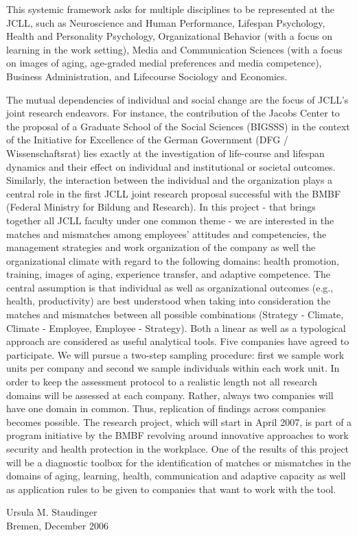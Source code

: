 This systemic framework asks for multiple disciplines to be represented at the JCLL, such as Neuroscience and Human Performance, Lifespan Psychology, Health and Personality Psychology, Organizational Behavior (with a focus on learning in the work setting), Media and Communication Sciences (with a focus on images of aging, age-graded medial preferences and media competence), Business Administration, and Lifecourse Sociology and Economics.


The mutual  dependencies of individual and social change are the focus of JCLL's joint research endeavors. For instance, the contribution of the Jacobs Center to the proposal of a Graduate School of the Social Sciences (BIGSSS) in the context of the Initiative for Excellence of the German Government (DFG / Wissenschaftsrat) lies exactly at the investigation of life-course and lifespan dynamics and their effect on individual and institutional or societal outcomes. Similarly, the interaction between the individual and the organization plays a central role in the first JCLL joint research proposal successful with the BMBF (Federal Ministry for Bildung and Research). In this project - that brings together all JCLL faculty under one common theme - we are interested in the matches and mismatches among employees' attitudes and competencies, the management strategies and work organization of the company as well the organizational climate with regard to the following domains: health promotion, training, images of aging, experience transfer, and adaptive competence. The central assumption is that individual as well as organizational outcomes (e.g., health, productivity) are best understood when taking into consideration the matches and mismatches between all possible combinations (Strategy - Climate, Climate - Employee, Employee - Strategy). Both a linear as well as a typological approach are considered as useful analytical tools. Five companies have agreed to participate. We will pursue a two-step sampling procedure: first we sample work units per company and second we sample individuals within each work unit. In order to keep the assessment protocol to a realistic length not all research domains will be assessed at each company. Rather, always two companies will have one domain in common. Thus, replication of findings across companies becomes possible. The research project, which will start in April 2007, is part of a program initiative by the BMBF revolving around innovative approaches to work security and health protection in the workplace. One of the results of this project will be a diagnostic toolbox for the identification of matches or mismatches in the domains of aging, learning, health, communication and adaptive capacity as well as application rules to be given to companies that want to work with the tool. 


Ursula M. Staudinger\\ 
Bremen, December 2006
